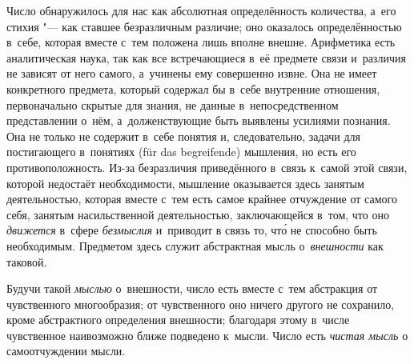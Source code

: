 Число обнаружилось для нас как абсолютная определённость количества, а~его
стихия "--- как ставшее безразличным различие; оно оказалось определённостью
в~себе, которая вместе с~тем положена лишь вполне внешне. Арифметика есть
аналитическая наука, так как все встречающиеся в~её предмете связи и~различия
не зависят от него самого, а~учинены ему совершенно извне. Она не имеет
конкретного предмета, который содержал бы в~себе внутренние отношения,
первоначально скрытые для знания, не данные в~непосредственном представлении
о~нём, а~долженствующие быть выявлены усилиями познания. Она не только не
содержит в~себе понятия и, следовательно, задачи для постигающего в~понятиях
(für das begrei\-fende) мышления, но есть его противоположность. Из-за
безразличия приведённого в~связь к~самой этой связи, которой недостаёт необходимости,
мышление оказывается здесь занятым деятельностью, которая вместе с~тем есть
самое крайнее отчуждение от самого себя, занятым насильственной деятельностью,
заключающейся в~том, что оно {\em движется} в~сфере {\em безмыслия} и~приводит
в связь то, чт\'{о} не способно быть необходимым. Предметом здесь
служит абстрактная мысль о~{\em внешности} как таковой.

Будучи такой {\em мыслью} о~внешности, число есть вместе с~тем абстракция от
чувственного многообразия; от чувственного оно ничего другого не сохранило,
кроме абстрактного определения внешности; благодаря этому в~числе чувственное
наивозможно ближе подведено к~мысли. Число есть {\em чистая мысль} о
самоотчуждении мысли.

